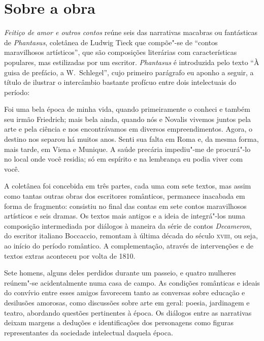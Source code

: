 
\section{Sobre a obra}

\textit{Feitiço de amor e outros contos} reúne seis das narrativas macabras ou fantásticas de \textit{Phantasus}, coletânea de Ludwig Tieck que compõe"-se de ``contos maravilhosos artísticos'', que são composições literárias com características populares, mas estilizadas por um escritor. 
\textit{Phantasus} é introduzida pelo texto ``À guisa de prefácio, 
a W.~Schlegel'', cujo primeiro parágrafo eu aponho a seguir, a título de
ilustrar o intercâmbio bastante profícuo entre dois intelectuais do período:

\begin{hedraquote}
Foi uma bela época de minha vida, quando primeiramente o conheci e
também seu irmão Friedrich; mais bela ainda, quando nós e Novalis
vivemos juntos pela arte e pela ciência e nos encontrávamos em diversos
empreendimentos. Agora, o destino nos separou há muitos anos. Senti sua
falta em Roma e, da mesma forma, mais tarde, em Viena e Munique. A
saúde precária impediu"-me de procurá"-lo no local onde você residia; só
em espírito e na lembrança eu podia viver com você.
\end{hedraquote}
  
A coletânea foi concebida em três partes, cada uma com sete textos,
mas assim como tantas outras obras dos escritores românticos, permanece
inacabada em forma de fragmento: consistiu no final das contas em sete
contos maravilhosos artísticos e seis dramas. Os textos mais antigos e a ideia de
integrá"-los numa composição intermediada por diálogos à maneira da
série de contos \textit{Decameron}, do escritor italiano Boccaccio,		
remontam à última década do século \textsc{xviii}, ou seja, 
ao início do período romântico. A complementação, através de 
intervenções e de textos extras aconteceu por volta de 1810. 

Sete homens, alguns deles perdidos durante um passeio, e quatro mulheres
reúnem"-se acidentalmente numa casa de campo. As condições românticas e
ideais do convívio entre esses amigos favorecem tanto as conversas
sobre educação e desilusões amorosas, como discussões sobre arte em
geral: poesia, jardinagem e teatro, abordando questões pertinentes à
época. Os diálogos entre as narrativas deixam margens a deduções e
identificações dos personagens como figuras representantes da sociedade
intelectual daquela época. 

